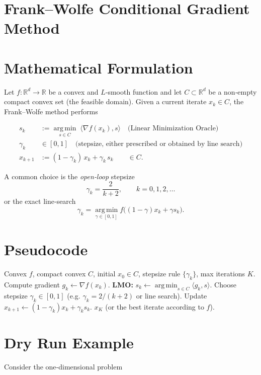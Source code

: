 \documentclass{article}
\newcommand{\R}{\mathbb{R}}
\newcommand{\inner}[2]{\langle #1,#2\rangle}
\newcommand{\argmin}{\operatorname*{arg\,min}}
\begin{document}
\section*{Frank–Wolfe Conditional Gradient Method}

\section*{Mathematical Formulation}
Let $f:\R^{d}\rightarrow \R$ be a convex and $L$‑smooth function and let $C\subset\R^{d}$ be a non‑empty compact convex set (the feasible domain).  
Given a current iterate $x_{k}\in C$, the Frank–Wolfe method performs

\[
\begin{aligned}
s_{k} &:= \argmin_{s\in C}\;\inner{\nabla f(x_{k})}{s} \quad\text{(Linear Minimization Oracle)}\tag{1}\\[4pt]
\gamma_{k} &\in[0,1]\quad\text{(stepsize, either prescribed or obtained by line search)}\\[4pt]
x_{k+1} &:= (1-\gamma_{k})\,x_{k}+\gamma_{k}\,s_{k}\qquad\in C.\tag{2}
\end{aligned}
\]

A common choice is the \emph{open‑loop} stepsize
\[
\gamma_{k}= \frac{2}{k+2},\qquad k=0,1,2,\dots
\]
or the exact line‑search
\[
\gamma_{k}= \argmin_{\gamma\in[0,1]} f\bigl((1-\gamma)x_{k}+\gamma s_{k}\bigr).
\]

\section*{Pseudocode}
\begin{algorithm}[H]
\caption{Frank–Wolfe Conditional Gradient}
\begin{algorithmic}[1]
\Require Convex $f$, compact convex $C$, initial $x_{0}\in C$, stepsize rule $\{\gamma_{k}\}$, max iterations $K$.
    \State Compute gradient $g_{k}\gets\nabla f(x_{k})$.
    \State \textbf{LMO:} $s_{k}\gets\argmin_{s\in C}\inner{g_{k}}{s}$.
    \State Choose stepsize $\gamma_{k}\in[0,1]$ (e.g. $\gamma_{k}=2/(k+2)$ or line search).
    \State Update $x_{k+1}\gets (1-\gamma_{k})x_{k}+\gamma_{k}s_{k}$.
\EndFor
\State \Return $x_{K}$ (or the best iterate according to $f$).
\end{algorithmic}
\end{algorithm}

\section*{Dry Run Example}
Consider the one‑dimensional problem  
\end{document}
